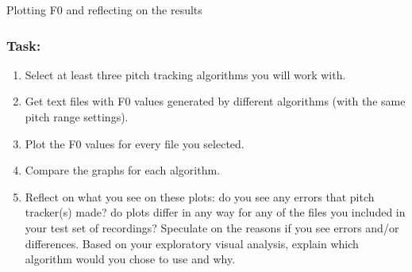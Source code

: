 \documentclass{../labbook}
\begin{document}
\begin{problem}{1}{10}{Plotting F0 and reflecting on the results}

\subsubsection*{Task:}

\begin{enumerate}
    \item Select at least three pitch tracking algorithms you will work with.
    \item Get text files with F0 values generated by different algorithms (with the same pitch range settings).
    \item Plot the F0 values for every file you selected. 
    \item Compare the graphs for each algorithm.
    \item Reflect on what you see on these plots: do you see any errors that pitch tracker(s) made? do plots differ in any way for any of the files you included in your test set of recordings? Speculate on the reasons if you see errors and/or differences.
    Based on your exploratory visual analysis, explain which algorithm would you chose to use and why.
   
\end{enumerate}

\end{problem}
\end{document}
